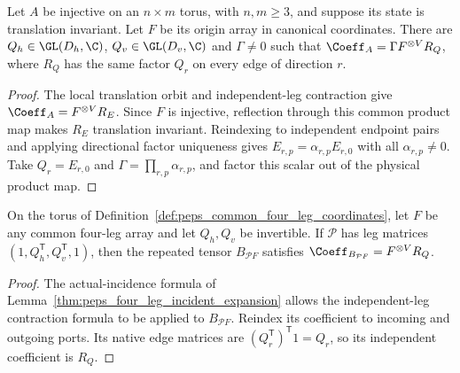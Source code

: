 \begin{lemma}%
    \label{thm:peps_uniform_edge_representation}
    \leanok
    Let $A$ be injective on an $n\times m$ torus, with $n,m\ge3$,
    and suppose its state is translation invariant. Let $F$ be its origin
    array in canonical coordinates. There are
    $Q_h\in\GL(D_h,\C)$, $Q_v\in\GL(D_v,\C)$ and $\Gamma\ne0$ such that
    $\Coeff_A=\Gamma F^{\otimes V}R_Q$, where $R_Q$ has the same factor
    $Q_r$ on every edge of direction $r$.
\end{lemma}
\begin{proof}\leanok
    The local translation orbit and independent-leg contraction give
    $\Coeff_A=F^{\otimes V}R_E$. Since $F$ is injective, reflection through
    this common product map makes $R_E$ translation invariant. Reindexing
    to independent endpoint pairs and applying directional factor uniqueness
    gives $E_{r,p}=\alpha_{r,p}E_{r,0}$ with all $\alpha_{r,p}\ne0$.
    Take $Q_r=E_{r,0}$ and $\Gamma=\prod_{r,p}\alpha_{r,p}$, and factor
    this scalar out of the physical product map.
\end{proof}

\begin{lemma}%
    \label{thm:peps_uniform_bond_absorption}
    \leanok
    On the torus of Definition~\ref{def:peps_common_four_leg_coordinates},
    let $F$ be any common four-leg array and let $Q_h,Q_v$ be invertible.
    If $\mathcal P$ has leg matrices
    $(1,Q_h^{\mathsf T},Q_v^{\mathsf T},1)$, then the repeated tensor
    $B_{\mathcal P F}$ satisfies $\Coeff_{B_{\mathcal P F}}=F^{\otimes V}R_Q$.
\end{lemma}
\begin{proof}\leanok
    The actual-incidence formula of
    Lemma~\ref{thm:peps_four_leg_incident_expansion} allows the
    independent-leg contraction formula to be applied to $B_{\mathcal P F}$.
    Reindex its coefficient to incoming and outgoing ports. Its native edge
    matrices are $(Q_r^{\mathsf T})^{\mathsf T}1=Q_r$, so its independent
    coefficient is $R_Q$.
\end{proof}


